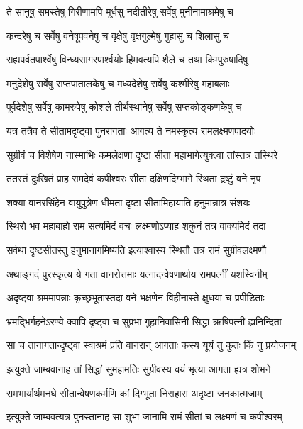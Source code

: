 \twolineshloka
{ते सानुषु समस्तेषु गिरीणामपि मूर्धसु}
{नदीतीरेषु सर्वेषु मुनीनामाश्रमेषु च} %

\twolineshloka
{कन्दरेषु च सर्वेषु वनेषूपवनेषु च}
{वृक्षेषु वृक्षगुल्मेषु गुहासु च शिलासु च} %

\twolineshloka
{सह्यपर्वतपार्श्वेषु विन्ध्यसागरपार्श्वयोः}
{हिमवत्यपि शैले च तथा किम्पुरुषादिषु} %

\twolineshloka
{मनुदेशेषु सर्वेषु सप्तपातालकेषु च}
{मध्यदेशेषु सर्वेषु कश्मीरेषु महाबलाः} %

\twolineshloka
{पूर्वदेशेषु सर्वेषु कामरुपेषु कोशले}
{तीर्थस्थानेषु सर्वेषु सप्तकोङ्कणकेषु च} %

\twolineshloka
{यत्र तत्रैव ते सीतामदृष्ट्वा पुनरागताः}
{आगत्य ते नमस्कृत्य रामलक्ष्मणपादयोः} %

\twolineshloka
{सुग्रीवं च विशेषेण नास्माभिः कमलेक्षणा}
{दृष्टा सीता महाभागेत्युक्त्वा तांस्तत्र तस्थिरे} %

\twolineshloka
{ततस्तं दुःखितं प्राह रामदेवं कपीश्वरः}
{सीता दक्षिणदिग्भागे स्थिता द्रष्टुं वने नृप} %

\twolineshloka
{शक्या वानरसिंहेन वायुपुत्रेण धीमता}
{दृष्टा सीतामिहायाति हनुमान्नात्र संशयः} %

\twolineshloka
{स्थिरो भव महाबाहो राम सत्यमिदं वचः}
{लक्ष्मणोऽप्याह शकुनं तत्र वाक्यमिदं तदा} %

\twolineshloka
{सर्वथा दृष्टसीतस्तु हनुमानागमिष्यति}
{इत्याश्वास्य स्थितौ तत्र रामं सुग्रीवलक्ष्मणौ} %

\twolineshloka
{अथाङ्गदं पुरस्कृत्य ये गता वानरोत्तमाः}
{यत्नादन्वेषणार्थाय रामपत्नीं यशस्विनीम्} %

\twolineshloka
{अदृष्ट्वा श्रममापन्नाः कृच्छ्रभूतास्तदा वने}
{भक्षणेन विहीनास्ते क्षुधया च प्रपीडिताः} %

\twolineshloka
{भ्रमद्भिर्गहनेऽरण्ये क्वापि दृष्ट्वा च सुप्रभा}
{गुहानिवासिनी सिद्धा ऋषिपत्नी ह्यनिन्दिता} %

\twolineshloka
{सा च तानागतान्दृष्ट्वा स्वाश्रमं प्रति वानरान्}
{आगताः कस्य यूयं तु कुतः किं नु प्रयोजनम्} %

\twolineshloka
{इत्युक्ते जाम्बवानाह तां सिद्धां सुमहामतिः}
{सुग्रीवस्य वयं भृत्या आगता ह्यत्र शोभने} %

\twolineshloka
{रामभार्यार्थमनघे सीतान्वेषणकर्मणि}
{कां दिग्भूता निराहारा अदृष्टा जनकात्मजाम्} %

\twolineshloka
{इत्युक्ते जाम्बवत्यत्र पुनस्तानाह सा शुभा}
{जानामि रामं सीतां च लक्ष्मणं च कपीश्वरम्} %

